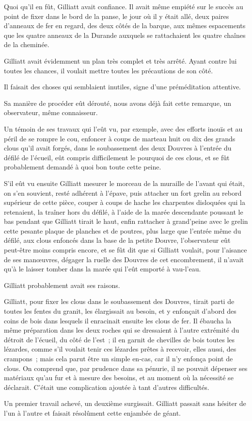 \documentclass[french,twoside]{book} %
\begin{document}
Quoi qu’il en fût, Gilliatt avait confiance. Il avait même empiété sur le succès au point de fixer dans le bord de la panse, le jour où il y était allé, deux paires d’anneaux de fer en regard, des deux côtés de la barque, aux mêmes espacements que les quatre anneaux de la Durande auxquels se rattachaient les quatre chaînes de la cheminée.\par
Gilliatt avait évidemment un plan très complet et très arrêté. Ayant contre lui toutes les chances, il voulait mettre toutes les précautions de son côté.\par
Il faisait des choses qui semblaient inutiles, signe d’une préméditation attentive.\par
Sa manière de procéder eût dérouté, nous avons déjà fait cette remarque, un observateur, même connaisseur.\par
Un témoin de ses travaux qui l’eût vu, par exemple, avec des efforts inouïs et au péril de se rompre le cou, enfoncer à coups de marteau huit ou dix des grands clous qu’il avait forgés, dans le soubassement des deux Douvres à l’entrée du défilé de l’écueil, eût compris difficilement le pourquoi de ces clous, et se  fût probablement demandé à quoi bon toute cette peine.\par
S’il eût vu ensuite Gilliatt mesurer le morceau de la muraille de l’avant qui était, on s’en souvient, resté adhérent à l’épave, puis attacher un fort grelin au rebord supérieur de cette pièce, couper à coups de hache les charpentes disloquées qui la retenaient, la traîner hors du défilé, à l’aide de la marée descendante poussant le bas pendant que Gilliatt tirait le haut, enfin rattacher à grand’peine avec le grelin cette pesante plaque de planches et de poutres, plus large que l’entrée même du défilé, aux clous enfoncés dans la base de la petite Douvre, l’observateur eût peut-être moins compris encore, et se fût dit que si Gilliatt voulait, pour l’aisance de ses manœuvres, dégager la ruelle des Douvres de cet encombrement, il n’avait qu’à le laisser tomber dans la marée qui l’eût emporté à vau-l’eau.\par
Gilliatt probablement avait ses raisons.\par
Gilliatt, pour fixer les clous dans le soubassement des Douvres, tirait parti de toutes les fentes du granit, les élargissait au besoin, et y enfonçait d’abord des coins de bois dans lesquels il enracinait ensuite les clous de fer. Il ébaucha la même préparation dans les deux roches qui se dressaient à l’autre extrémité du détroit de l’écueil, du côté de l’est ; il en garnit de chevilles de bois toutes les lézardes, comme s’il voulait tenir ces lézardes prêtes à recevoir, elles aussi, des crampons ; mais cela parut être un simple en-cas, car il n’y enfonça point de clous. On comprend que, par  prudence dans sa pénurie, il ne pouvait dépenser ses matériaux qu’au fur et à mesure des besoins, et au moment où la nécessité se déclarait. C’était une complication ajoutée à tant d’autres difficultés.\par
Un premier travail achevé, un deuxième surgissait. Gilliatt passait sans hésiter de l’un à l’autre et faisait résolûment cette enjambée de géant.
\end{document}
